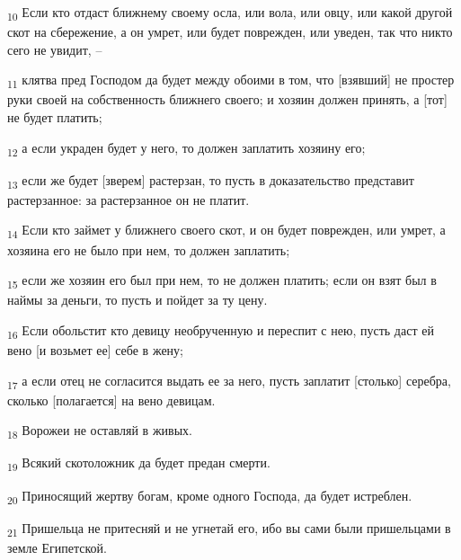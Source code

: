 \begin{tcolorbox}
\textsubscript{10} Если кто отдаст ближнему своему осла, или вола, или овцу, или какой другой скот на сбережение, а он умрет, или будет поврежден, или уведен, так что никто сего не увидит, --
\end{tcolorbox}
\begin{tcolorbox}
\textsubscript{11} клятва пред Господом да будет между обоими в том, что [взявший] не простер руки своей на собственность ближнего своего; и хозяин должен принять, а [тот] не будет платить;
\end{tcolorbox}
\begin{tcolorbox}
\textsubscript{12} а если украден будет у него, то должен заплатить хозяину его;
\end{tcolorbox}
\begin{tcolorbox}
\textsubscript{13} если же будет [зверем] растерзан, то пусть в доказательство представит растерзанное: за растерзанное он не платит.
\end{tcolorbox}
\begin{tcolorbox}
\textsubscript{14} Если кто займет у ближнего своего скот, и он будет поврежден, или умрет, а хозяина его не было при нем, то должен заплатить;
\end{tcolorbox}
\begin{tcolorbox}
\textsubscript{15} если же хозяин его был при нем, то не должен платить; если он взят был в наймы за деньги, то пусть и пойдет за ту цену.
\end{tcolorbox}
\begin{tcolorbox}
\textsubscript{16} Если обольстит кто девицу необрученную и переспит с нею, пусть даст ей вено [и возьмет ее] себе в жену;
\end{tcolorbox}
\begin{tcolorbox}
\textsubscript{17} а если отец не согласится выдать ее за него, пусть заплатит [столько] серебра, сколько [полагается] на вено девицам.
\end{tcolorbox}
\begin{tcolorbox}
\textsubscript{18} Ворожеи не оставляй в живых.
\end{tcolorbox}
\begin{tcolorbox}
\textsubscript{19} Всякий скотоложник да будет предан смерти.
\end{tcolorbox}
\begin{tcolorbox}
\textsubscript{20} Приносящий жертву богам, кроме одного Господа, да будет истреблен.
\end{tcolorbox}
\begin{tcolorbox}
\textsubscript{21} Пришельца не притесняй и не угнетай его, ибо вы сами были пришельцами в земле Египетской.
\end{tcolorbox}
